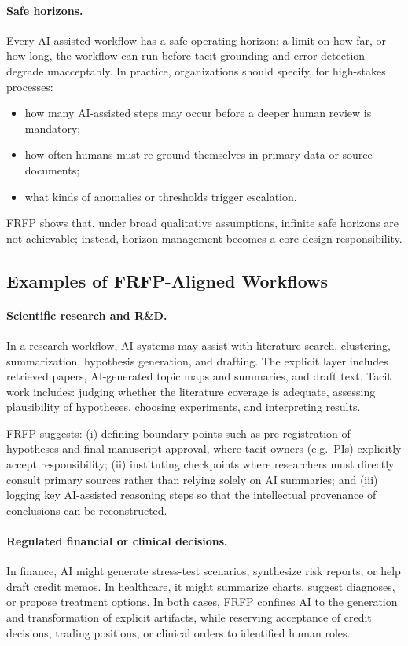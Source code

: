 \paragraph{Safe horizons.}
Every AI-assisted workflow has a safe operating horizon: a limit on how far, or how long, the workflow can run before tacit grounding and error-detection degrade unacceptably.
In practice, organizations should specify, for high-stakes processes:

\begin{itemize}
  \item how many AI-assisted steps may occur before a deeper human review is mandatory;
  \item how often humans must re-ground themselves in primary data or source documents;
  \item what kinds of anomalies or thresholds trigger escalation.
\end{itemize}

FRFP shows that, under broad qualitative assumptions, infinite safe horizons are not achievable; instead, horizon management becomes a core design responsibility.

\subsection{Examples of FRFP-Aligned Workflows}

\paragraph{Scientific research and R\&D.}
In a research workflow, AI systems may assist with literature search, clustering, summarization, hypothesis generation, and drafting.
The explicit layer includes retrieved papers, AI-generated topic maps and summaries, and draft text.
Tacit work includes: judging whether the literature coverage is adequate, assessing plausibility of hypotheses, choosing experiments, and interpreting results.

FRFP suggests:
(i) defining boundary points such as pre-registration of hypotheses and final manuscript approval, where tacit owners (e.g.\ PIs) explicitly accept responsibility;
(ii) instituting checkpoints where researchers must directly consult primary sources rather than relying solely on AI summaries;
and (iii) logging key AI-assisted reasoning steps so that the intellectual provenance of conclusions can be reconstructed.

\paragraph{Regulated financial or clinical decisions.}
In finance, AI might generate stress-test scenarios, synthesize risk reports, or help draft credit memos.
In healthcare, it might summarize charts, suggest diagnoses, or propose treatment options.
In both cases, FRFP confines AI to the generation and transformation of explicit artifacts, while reserving acceptance of credit decisions, trading positions, or clinical orders to identified human roles.

